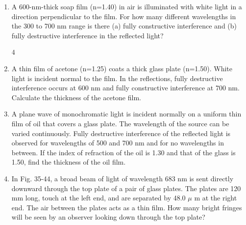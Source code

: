 \documentclass[fleqn]{article}
\begin{document}
\begin{enumerate}
    \item A 600-nm-thick soap film (n=1.40) in air is illuminated with white light in a direction perpendicular to the film. For how many different wavelengths in the 300 to 700 nm range is there (a) fully constructive interference and (b) fully destructive interference in the reflected light?

    \textcolor{hwColor}{
      $
        4
      $
    }

    \item A thin film of acetone (n=1.25) coats a thick glass plate (n=1.50). White light is incident normal to the film. In the reflections, fully destructive interference occurs at 600 nm and fully constructive interference at 700 nm. Calculate the thickness of the acetone film.

    \item A plane wave of monochromatic light is incident normally on a uniform thin film of oil that covers a glass plate. The wavelength of the source can be varied continuously. Fully destructive interference of the reflected light is observed for wavelengths of 500 and 700 nm and for no wavelengths in between. If the index of refraction of the oil is 1.30 and that of the glass is 1.50, find the thickness of the oil film.
    
    \item In Fig. 35-44, a broad beam of light of wavelength 683 nm is sent directly downward through the top plate of a pair of glass plates. The plates are 120 mm long, touch at the left end, and are separated by 48.0 $\mu$ m at the right end. The air between the plates acts as a thin film. How many bright fringes will be seen by an observer looking down through the top plate?
    
  \end{enumerate}
\end{document}
